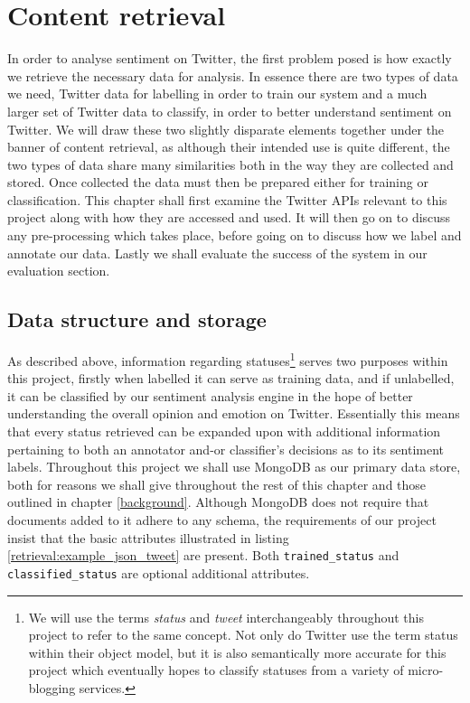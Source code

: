 \chapter{Content retrieval}
\label{retrieval}

In order to analyse sentiment on Twitter, the first problem posed is how exactly we retrieve the necessary data for analysis. In essence there are two types of data we need, Twitter data for labelling in order to train our system and a much larger set of Twitter data to classify, in order to better understand sentiment on Twitter. We will draw these two slightly disparate elements together under the banner of content retrieval, as although their intended use is quite different, the two types of data share many similarities both in the way they are collected and stored. Once collected the data must then be prepared either for training or classification. This chapter shall first examine the Twitter APIs relevant to this project along with how they are accessed and used. It will then go on to discuss any pre-processing which takes place, before going on to discuss how we label and annotate our data. Lastly we shall evaluate the success of the system in our evaluation section.

\section{Data structure and storage}
\label{retrieval:data}

As described above, information regarding statuses\footnote{We will use the terms \emph{status} and \emph{tweet} interchangeably throughout this project to refer to the same concept. Not only do Twitter use the term status within their object model, but it is also semantically more accurate for this project which eventually hopes to classify statuses from a variety of micro-blogging services.} serves two purposes within this project, firstly when labelled it can serve as training data, and if unlabelled, it can be classified by our sentiment analysis engine in the hope of better understanding the overall opinion and emotion on Twitter. Essentially this means that every status retrieved can be expanded upon with additional information pertaining to both an annotator and-or classifier's decisions as to its sentiment labels. Throughout this project we shall use MongoDB as our primary data store, both for reasons we shall give throughout the rest of this chapter and those outlined in chapter \ref{background}. Although MongoDB does not require that documents added to it adhere to any schema, the requirements of our project insist that the basic attributes illustrated in listing \ref{retrieval:example_json_tweet} are present. Both \texttt{trained\-\_status} and \texttt{classified\-\_status} are optional additional attributes.

